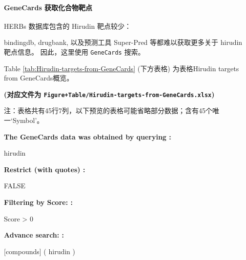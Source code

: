 \documentclass[
]{article}
\begin{document}
\hypertarget{genecards-ux83b7ux53d6ux5316ux5408ux7269ux9776ux70b9}{%
\paragraph{GeneCards 获取化合物靶点}\label{genecards-ux83b7ux53d6ux5316ux5408ux7269ux9776ux70b9}}

HERBs 数据库包含的 Hirudin 靶点较少：

bindingdb, drugbank, 以及预测工具 Super-Pred 等都难以获取更多关于 hirudin 靶点信息。
因此，这里使用 \texttt{GeneCards} 搜索。

Table \ref{tab:Hirudin-targets-from-GeneCards} (下方表格) 为表格Hirudin targets from GeneCards概览。

\textbf{(对应文件为 \texttt{Figure+Table/Hirudin-targets-from-GeneCards.xlsx})}

\begin{center}\begin{tcolorbox}[colback=gray!10, colframe=gray!50, width=0.9\linewidth, arc=1mm, boxrule=0.5pt]注：表格共有45行7列，以下预览的表格可能省略部分数据；含有45个唯一`Symbol'。
\end{tcolorbox}
\end{center}\begin{center}\begin{tcolorbox}[colback=gray!10, colframe=gray!50, width=0.9\linewidth, arc=1mm, boxrule=0.5pt]
\textbf{
The GeneCards data was obtained by querying
:}

\vspace{0.5em}

    hirudin

\vspace{2em}


\textbf{
Restrict (with quotes)
:}

\vspace{0.5em}

    FALSE

\vspace{2em}


\textbf{
Filtering by Score:
:}

\vspace{0.5em}

    Score > 0

\vspace{2em}


\textbf{
Advance search:
:}

\vspace{0.5em}

    [compounds] ( hirudin )

\vspace{2em}
\end{tcolorbox}
\end{center}
\end{document}
